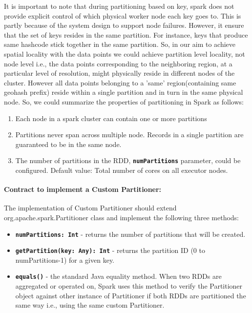 \documentclass[article,type=msc,colorback,12pt,accentcolor=tud1d]{tudthesis}
\begin{document}
			\par It is important to note that during partitioning based on key, spark does not provide explicit control of which physical worker node each key goes to. This is partly because of the system design to support node failures.\cite{sparkbook} However, it ensure that the set of keys resides in the same partition. For instance, keys that produce same hashcode stick together  in the same partition. So, in our aim to achieve spatial locality with the data points we could achieve partition level locality, not node level i.e., the data points corresponding to the neighboring region, at a particular level of resolution, might physically reside in different nodes of the cluster. However all data points belonging to a 'same' region(containing same geohash prefix) reside within a single partition and in turn in the same physical node. So, we could summarize the properties of partitioning in Spark as follows: \cite{partitioningHeather} 
			 
			 \begin{enumerate}
			 	\item Each node in a spark cluster can contain one or more partitions
			 \item Partitions never span across multiple node. Records in a single partition are guaranteed to be in the same node.
			\item  The number of partitions in the RDD, \texttt{\textbf{numPartitions}} parameter, could be configured. Default value: Total number of cores on all executor nodes.
			 \end{enumerate}
			
		\paragraph{	Contract to implement a Custom Partitioner: }
			The implementation of Custom Partitioner should extend org.apache.spark.Partitioner class and implement the following three methods:\cite{sparkbook}
			
			\begin{itemize}
				\item \textbf{\texttt{numPartitions: Int}} - returns the number of partitions that will be created.
				\item \textbf{\texttt{getPartition(key: Any): Int}} - returns the partition ID (0 to numPartitions-1) for a given key.
				\item \textbf{\texttt{equals()}} - the standard Java equality method. When two RDDs are aggregated or operated on, Spark uses this method to verify the Partitioner object against other instance of Partitioner if both RDDs are partitioned the same way i.e., using the same custom Partitioner.
			\end{itemize}
			\clearpage
\end{document}
